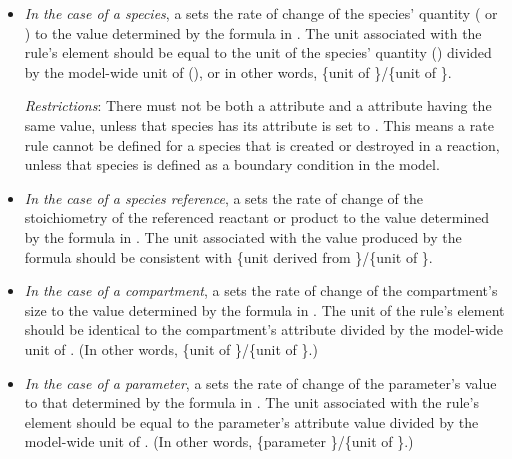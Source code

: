 \begin{itemize}
  
\item \emph{In the case of a species}, a \RateRule sets the rate
  of change of the species' quantity ( or
  ) to the value determined by the formula in
  .  The unit associated with the rule's 
  element should be equal to the unit of the species' quantity
  () divided by the model-wide unit
  of  (), or in other
  words, \{unit of \}/\{unit of
  \}.

  \emph{Restrictions}: There must not be both a \RateRule
   attribute and a \SpeciesReference {}
  attribute having the same value, unless that species has its
   attribute is set to .  This
  means a rate rule cannot be defined for a species that is
  created or destroyed in a reaction, unless that species is
  defined as a boundary condition in the model.

\item \emph{In the case of a species reference}, a \RateRule sets
  the rate of change of the stoichiometry of the referenced
  reactant or product to the value determined by the formula in
  .  The unit associated with the value produced by
  the formula should be consistent with \{unit derived from
  \}/\{unit of \}.
  
\item \emph{In the case of a compartment}, a \RateRule sets the
  rate of change of the compartment's size to the value determined
  by the formula in .  The unit of the rule's
   element should be identical to the compartment's
   attribute divided by the model-wide unit of
  .  (In other words, \{unit of
  \}/\{unit of \}.)

\item \emph{In the case of a parameter}, a \RateRule sets the rate
  of change of the parameter's value to that determined by the
  formula in .  The unit associated with the rule's
   element should be equal to the parameter's
   attribute value divided by the model-wide unit of
  .  (In other words, \{parameter
  \}/\{unit of \}.)


\end{itemize}

